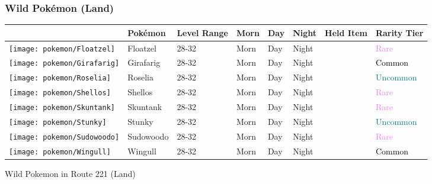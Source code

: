\subsubsection{Wild Pokémon (Land)}%
\label{ssubsec:WildPokmon(Land)}%
\begin{longtable}{||l l l l l l l l||}%
\hline%
&Pokémon&Level Range&Morn&Day&Night&Held Item&Rarity Tier\\%
\hline%
\endhead%
\hline%
\texttt{[image: pokemon/Floatzel]}&Floatzel&28{-}32&Morn&Day&Night&&\textcolor{violet}{%
Rare%
}\\%
\hline%
\texttt{[image: pokemon/Girafarig]}&Girafarig&28{-}32&Morn&Day&Night&&\textcolor{black}{%
Common%
}\\%
\hline%
\texttt{[image: pokemon/Roselia]}&Roselia&28{-}32&Morn&Day&Night&&\textcolor{teal}{%
Uncommon%
}\\%
\hline%
\texttt{[image: pokemon/Shellos]}&Shellos&28{-}32&Morn&Day&Night&&\textcolor{violet}{%
Rare%
}\\%
\hline%
\texttt{[image: pokemon/Skuntank]}&Skuntank&28{-}32&Morn&Day&Night&&\textcolor{violet}{%
Rare%
}\\%
\hline%
\texttt{[image: pokemon/Stunky]}&Stunky&28{-}32&Morn&Day&Night&&\textcolor{teal}{%
Uncommon%
}\\%
\hline%
\texttt{[image: pokemon/Sudowoodo]}&Sudowoodo&28{-}32&Morn&Day&Night&&\textcolor{violet}{%
Rare%
}\\%
\hline%
\texttt{[image: pokemon/Wingull]}&Wingull&28{-}32&Morn&Day&Night&&\textcolor{black}{%
Common%
}\\%
\hline%
\end{longtable}%
\caption{Wild Pokemon in Route 221 (Land)}